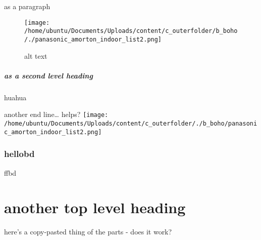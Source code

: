 \documentclass{paper}
\begin{document}
as a paragraph

\begin{figure}
\centering
\texttt{[image: /home/ubuntu/Documents/Uploads/content/c\_outerfolder/b\_boho/./panasonic\_amorton\_indoor\_list2.png]}
\caption{alt text}
\end{figure}

\hypertarget{as-a-second-level-heading}{%
\subsubsection{as a second level
heading}\label{as-a-second-level-heading}}

huahua

another end line\ldots{} helps?
\texttt{[image: /home/ubuntu/Documents/Uploads/content/c\_outerfolder/./b\_boho/panasonic\_amorton\_indoor\_list2.png]}

\hypertarget{hellobd}{%
\section{hellobd}\label{hellobd}}

ffbd

\part{another top level heading}

here's a copy-pasted thing of the parts - does it work?
\end{document}

